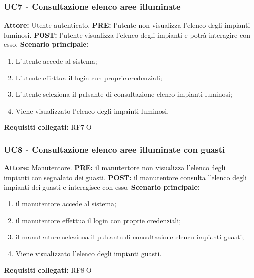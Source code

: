 \documentclass[a4paper, 12pt]{article}
\begin{document}
\subsubsection{UC7 - Consultazione elenco aree illuminate}
\textbf{Attore:} Utente autenticato.\newline
\textbf{PRE:} l'utente non visualizza l'elenco degli impianti luminosi.\newline
\textbf{POST:} l'utente visualizza l'elenco degli impianti e potrà interagire con esso.\newline
\textbf{Scenario principale:}
\begin{enumerate}
    \item L'utente accede al sistema;
    \item L'utente effettua il login con proprie credenziali;
    \item L'utente seleziona il pulsante di consultazione elenco impianti luminosi;
    \item Viene visualizzato l'elenco degli impainti luminosi.
\end{enumerate}
\textbf{Requisiti collegati:} RF7-O\newline

\subsubsection{UC8 - Consultazione elenco aree illuminate con guasti}
\textbf{Attore:} Manutentore.\newline
\textbf{PRE:} il manutentore non visualizza l'elenco degli impianti con segnalato dei guasti.\newline
\textbf{POST:} il manutentore consulta l'elenco degli impianti dei guasti e interagisce con esso.\newline
\textbf{Scenario principale:}
\begin{enumerate}
    \item il manutentore accede al sistema;
    \item il manutentore effettua il login con proprie credenziali;
    \item il manutentore seleziona il pulsante di consultazione elenco impianti guasti;
    \item Viene visualizzato l'elenco degli impianti guasti.
\end{enumerate}
\textbf{Requisiti collegati:} RF8-O\newline
\end{document}
